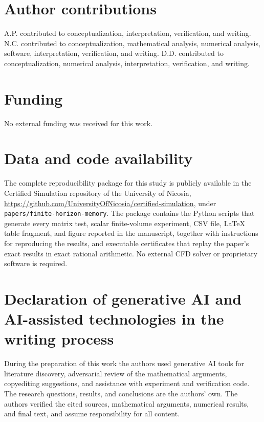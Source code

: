 \documentclass[preprint,12pt]{elsarticle}
\theoremstyle{plain}
\theoremstyle{remark}
\theoremstyle{definition}
\begin{document}
\section*{Author contributions}
A.P. contributed to conceptualization, interpretation, verification, and writing.  N.C. contributed to conceptualization, mathematical analysis, numerical analysis, software, interpretation, verification, and writing.  D.D. contributed to conceptualization, numerical analysis, interpretation, verification, and writing.

\section*{Funding}
No external funding was received for this work.

\section*{Data and code availability}

The complete reproducibility package for this study is publicly
available in the Certified Simulation repository of the University of
Nicosia,
\url{https://github.com/UniversityOfNicosia/certified-simulation},
under \texttt{papers/finite-horizon-memory}.  The package contains
the Python scripts that generate every matrix test, scalar
finite-volume experiment, CSV file, LaTeX table fragment, and figure
reported in the manuscript, together with instructions for
reproducing the results, and executable certificates that replay the
paper's exact results in exact rational arithmetic.  No external CFD
solver or proprietary software is required.

\section*{Declaration of generative AI and AI-assisted technologies in the writing process}

During the preparation of this work the authors used generative AI tools for
literature discovery, adversarial review of the mathematical
arguments, copyediting suggestions, and assistance with experiment
and verification code.  The research questions, results, and
conclusions are the authors' own.  The authors verified the cited
sources, mathematical arguments, numerical results, and final text,
and assume responsibility for all content.



\end{document}
